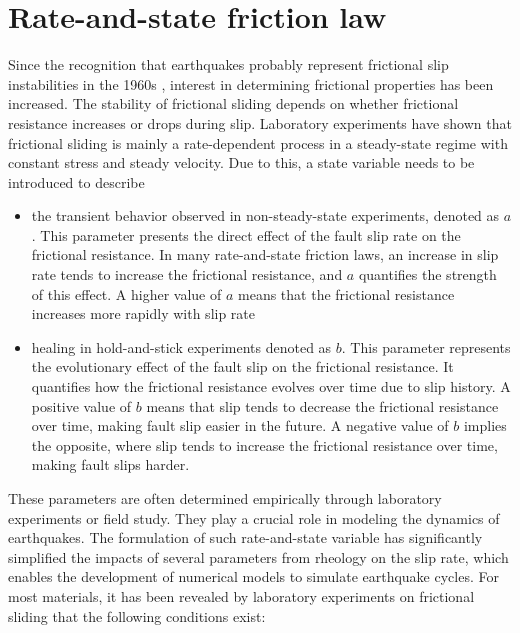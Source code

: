 \section{Rate-and-state friction law}
Since the recognition that earthquakes probably represent frictional slip instabilities in the 1960s \citep{brace66}, interest in determining frictional properties has been increased.
The stability of frictional sliding depends on whether frictional resistance increases or drops during slip.
Laboratory experiments have shown that frictional sliding is mainly a rate-dependent process in a steady-state regime with constant stress and steady velocity. \citep{annurev:/content/journals/10.1146/annurev.earth.26.1.643}
Due to this, a state variable needs to be introduced to describe
\begin{itemize}
    \item the transient behavior observed in non-steady-state experiments, denoted as $a$. This parameter presents the direct effect of the fault slip rate on the frictional resistance. In many rate-and-state friction laws, an increase in slip rate tends to increase the frictional resistance, and $a$ quantifies the strength of this effect. A higher value of $a$ means that the frictional resistance increases more rapidly with slip rate
    \item healing in hold-and-stick experiments denoted as $b$. This parameter represents the evolutionary effect of the fault slip on the frictional resistance. It quantifies how the frictional resistance evolves over time due to slip history. A positive value of $b$ means that slip tends to decrease the frictional resistance over time, making fault slip easier in the future. A negative value of $b$ implies the opposite, where slip tends to increase the frictional resistance over time, making fault slips harder.
\end{itemize}
These parameters are often determined empirically through laboratory experiments or field study. They play a crucial role in modeling the dynamics of earthquakes.
The formulation of such rate-and-state variable has significantly simplified the impacts of several parameters from rheology on the slip rate, which enables the development of numerical models to simulate earthquake cycles.
For most materials, it has been revealed by laboratory experiments on frictional sliding that the following conditions exist:

